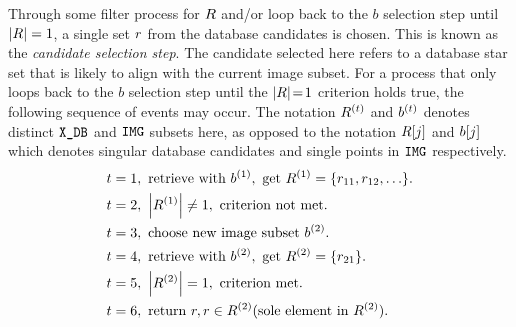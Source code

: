 Through some filter process for $R$ and/or loop back to the $b$ selection step until $\left| R \right| = 1$, a single set $r$ from the database candidates is  chosen.
This is known as the \emph{candidate selection step}.
The candidate selected here refers to a database star set that is likely to align with the current image subset.
For a process that only loops back to the $b$ selection step until the $|R| \!=\! 1$ criterion holds true, the following sequence of events may occur.
The notation $R^{(t)}$ and $b^{(t)}$ denotes distinct $\texttt{X\_DB}$ and $\texttt{IMG}$ subsets here, as opposed to the notation $R[j]$ and $b[j]$ which denotes singular database candidates and single points in $\texttt{IMG}$ respectively.
\begin{align*}
    &t = 1, \text{ retrieve with } b^{(1)}, \text{ get } R^{(1)} = \{r_{11}, r_{12}, \ldots\}. \\
    &t = 2, \ \left|  R^{(1)}  \right| \neq 1, \text{ criterion not met. } \\
    &t = 3, \text{ choose new image subset } b^{(2)}. \\
    &t = 4, \text{ retrieve with } b^{(2)}, \text{ get } R^{(2)} = \{r_{21}\}. \\
    &t = 5, \ \left|  R^{(2)}  \right| = 1, \text{ criterion met. } \\
    &t = 6, \text{ return } r, r \in R^{(2)} (\text{sole element in } R^{(2)} ).
\end{align*}

